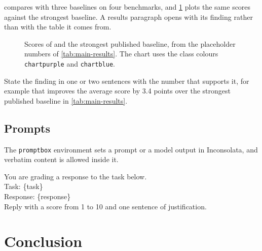 \documentclass{banglab}
\begin{document}
 compares \method{} with three baselines on four benchmarks, and \cref{fig:benchmark-scores} plots the same scores against the strongest baseline.
A results paragraph opens with its finding rather than with the table it comes from.

\begin{table}[t]
  \centering
  \caption{Main results on four benchmarks. The best score in each column is in bold and the second best is underlined. All numbers are placeholders.}
  \label{tab:main-results}
  
\end{table}

\begin{figure}[t]
  \centering
  
  \caption{Scores of \method{} and the strongest published baseline, from the placeholder numbers of \cref{tab:main-results}. The chart uses the class colours \texttt{chartpurple} and \texttt{chartblue}.}
  \label{fig:benchmark-scores}
\end{figure}

\begin{takeaway}[Takeaway]
State the finding in one or two sentences with the number that supports it, for example that \method{} improves the average score by 3.4 points over the strongest published baseline in \cref{tab:main-results}.
\end{takeaway}

\subsection{Prompts}
\label{sec:prompts}

The \texttt{promptbox} environment sets a prompt or a model output in Inconsolata, and verbatim content is allowed inside it.

\begin{promptbox}
You are grading a response to the task below.\\
Task: \{task\}\\
Response: \{response\}\\
Reply with a score from 1 to 10 and one sentence of justification.
\end{promptbox}

\section{Conclusion}
\label{sec:conclusion}
\end{document}
